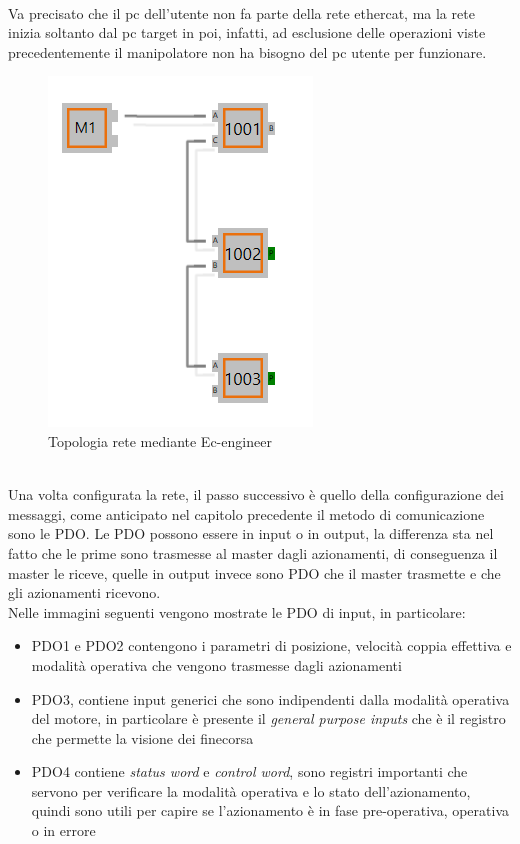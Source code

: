 \\Va precisato che il pc dell'utente non fa parte della rete ethercat, ma la rete inizia soltanto dal pc target in poi, infatti, ad esclusione delle operazioni viste precedentemente il manipolatore non ha bisogno del pc utente per funzionare.
\begin{figure}[ht]
	\begin{center}
		\includegraphics[scale=0.7]{Immagini/Sperimentale/NetTopology.png}
		\caption{Topologia rete mediante Ec-engineer}
		\label{fig:NetTopology2}
	\end{center}
\end{figure}
\\Una volta configurata la rete, il passo successivo è quello della configurazione dei messaggi, come anticipato nel capitolo precedente il metodo di comunicazione sono le PDO. Le PDO possono essere in input o in output, la differenza sta nel fatto che le prime sono trasmesse al master dagli azionamenti, di conseguenza il master le riceve, quelle in output invece sono PDO che il master trasmette e che gli azionamenti ricevono. 
\\Nelle immagini seguenti vengono mostrate le PDO di input, in particolare:
\begin{itemize}
 	\item PDO1 e PDO2 contengono i parametri di posizione, velocità coppia effettiva e modalità operativa che vengono trasmesse dagli azionamenti
 	\item PDO3, contiene input generici che sono indipendenti dalla modalità operativa del motore, in particolare è presente il \textit{general purpose inputs} che è il registro che permette la visione dei finecorsa
 	\item PDO4 contiene \textit{status word} e \textit{control word}, sono registri importanti che servono per verificare la modalità operativa e lo stato dell'azionamento, quindi sono utili per capire se l'azionamento è in fase pre-operativa, operativa o in errore
\end{itemize}
